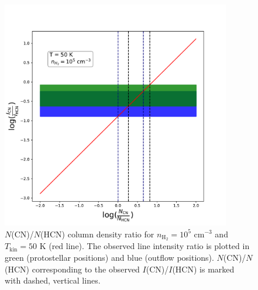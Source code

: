 \documentclass[a4paper]{article}
\begin{document}
\begin{figure}[!h]
\centering
\includegraphics[height=10cm]{radex.pdf}
\caption{$N$(CN)/$N$(HCN) column density ratio for $n_\mathrm{H_2} = 10^5$ cm$^{-3}$ and $T_\mathrm{kin} = 50$ K (red line). The observed line intensity ratio is plotted in green (protostellar positions) and blue (outflow positions). $N$(CN)/$N$(HCN) corresponding to the observed $I$(CN)/$I$(HCN) is marked with dashed, vertical lines.}\label{fig3}
\end{figure}
\end{document}
